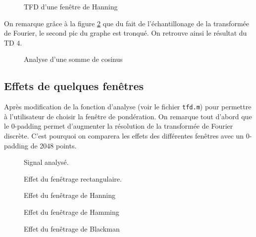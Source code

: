 \documentclass[french]{article}
\begin{document}
\begin{figure}[h!]
	\centering
	
	\caption{TFD d'une fenêtre de Hanning}
	\label{fig:hanning}
\end{figure}

On remarque grâce à la figure \ref{fig:hanning_sans_0p} que du fait de l'échantillonage de la transformée de Fourier, le second pic du graphe est tronqué. On retrouve ainsi le résultat du TD 4.

\begin{figure}[h!]
	\centering
	
	\caption{Analyse d'une somme de cosinus}
	\label{fig:hanning_sans_0p}
\end{figure}

\subsection{Effets de quelques fenêtres}

Après modification de la fonction d'analyse (voir le fichier \verb`tfd.m`) pour permettre à l'utilisateur de choisir la fenêtre de pondération. On remarque tout d'abord que le 0-padding permet d'augmenter la résolution de la transformée de Fourier discrète. C'est pourquoi on comparera les effets des différentes fenêtres avec un 0-padding de 2048 points.

  
\begin{figure}[h!]
	\centering
	\begin{minipage}{\textwidth}
		\centering
		
		\caption{Signal analysé.}
		\label{fig:fen_signal}
	\end{minipage}
\end{figure}
\begin{figure}[h!]
  	\begin{minipage}{\textwidth}
  		\centering
  		
  		\caption{Effet du fenêtrage rectangulaire.}
  		\label{fig:fen_rectangle}
  	\end{minipage}
  	\begin{minipage}{\textwidth}
  		\centering
  		
  		\caption{Effet du fenêtrage de Hanning}
  		\label{fig:fen_hanning}
	\end{minipage}
	\begin{minipage}{\textwidth}
		\centering
		
		\caption{Effet du fenêtrage de Hamming}
		\label{fig:fen_hamming}
	\end{minipage}
	\begin{minipage}{\textwidth}
		\centering
		
		\caption{Effet du fenêtrage de Blackman}
		\label{fig:fen_blackman}
	\end{minipage}
\end{figure}
\end{document}
